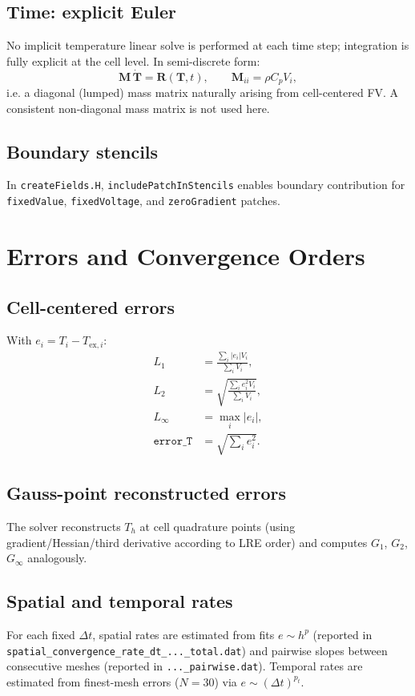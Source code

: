 \documentclass[11pt,a4paper]{article}
\begin{document}
\subsection{Time: explicit Euler}
No implicit temperature linear solve is performed at each time step; integration is fully explicit at the cell level.
In semi-discrete form:
\begin{equation}
\mathbf{M}\,\dot{\mathbf{T}} = \mathbf{R}(\mathbf{T},t), \qquad \mathbf{M}_{ii}=\rho C_p V_i,
\end{equation}
i.e. a diagonal (lumped) mass matrix naturally arising from cell-centered FV. A consistent non-diagonal mass matrix is not used here.

\subsection{Boundary stencils}
In \texttt{createFields.H}, \texttt{includePatchInStencils} enables boundary contribution for \texttt{fixedValue}, \texttt{fixedVoltage}, and \texttt{zeroGradient} patches.
\section{Errors and Convergence Orders}
\subsection{Cell-centered errors}
With $e_i=T_i-T_{\mathrm{ex},i}$:
\begin{align}
L_1 &= \frac{\sum_i |e_i|V_i}{\sum_i V_i}, \\
L_2 &= \sqrt{\frac{\sum_i e_i^2V_i}{\sum_i V_i}}, \\
L_\infty &= \max_i |e_i|, \\
\texttt{error\_T} &= \sqrt{\sum_i e_i^2}.
\end{align}

\subsection{Gauss-point reconstructed errors}
The solver reconstructs $T_h$ at cell quadrature points (using gradient/Hessian/third derivative according to LRE order) and computes $G_1$, $G_2$, $G_\infty$ analogously.

\subsection{Spatial and temporal rates}
For each fixed $\Delta t$, spatial rates are estimated from fits $e\sim h^p$ (reported in \texttt{spatial\_convergence\_rate\_dt\_...\_total.dat}) and pairwise slopes between consecutive meshes (reported in \texttt{...\_pairwise.dat}).
Temporal rates are estimated from finest-mesh errors ($N=30$) via $e\sim (\Delta t)^{p_t}$.
\end{document}
